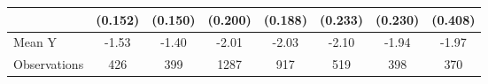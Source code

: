 {\begin{tabular}{l*{7}{c}}
            &     (0.152)         &     (0.150)         &     (0.200)         &     (0.188)         &     (0.233)         &     (0.230)         &     (0.408)         \\
\midrule
Mean Y      &       -1.53         &       -1.40         &       -2.01         &       -2.03         &       -2.10         &       -1.94         &       -1.97         \\
Observations&         426         &         399         &        1287         &         917         &         519         &         398         &         370         \\
\bottomrule
\end{tabular}
}

